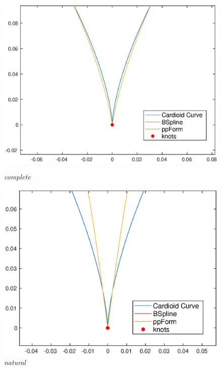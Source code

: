 \documentclass[11pt,en]{elegantpaper}
\begin{document}
\begin{figure}[htbp]
    \centering
    \begin{minipage}[t]{0.24\linewidth}
        \centering
        \includegraphics[width=0.9\linewidth]{figure/curve_cardioid_complete_local.eps}
        \caption{\textit{complete}}
        \label{fig:side:a}
    \end{minipage}%
    \begin{minipage}[t]{0.24\linewidth}
        \centering
        \includegraphics[width=0.9\linewidth]{figure/curve_cardioid_natural_local.eps}
        \caption{\textit{natural}}
        \label{fig:side:b}
    \end{minipage}
    \begin{minipage}[t]{0.24\linewidth}
        \centering

\end{minipage}
\end{figure}
\end{document}
